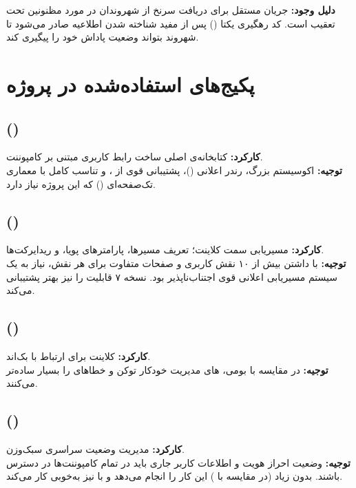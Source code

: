 \documentclass[12pt]{article} %
\theoremstyle{definition}
\begin{document}
\textbf{دلیل وجود:}
جریان مستقل برای دریافت سرنخ از شهروندان در مورد مظنونین تحت تعقیب است.
کد رهگیری یکتا () پس از مفید شناخته شدن اطلاعیه صادر می‌شود تا شهروند بتواند وضعیت پاداش خود را پیگیری کند.

\section{پکیج‌های  استفاده‌شده در پروژه}

\subsection{ ()}
\textbf{کارکرد:} کتابخانه‌ی اصلی ساخت رابط کاربری مبتنی بر کامپوننت.\\
\textbf{توجیه:} اکوسیستم بزرگ، رندر اعلانی ()، پشتیبانی قوی از ، و تناسب کامل با معماری تک‌صفحه‌ای () که این پروژه نیاز دارد.

\subsection{ ()}
\textbf{کارکرد:} مسیریابی سمت کلاینت؛ تعریف مسیرها، پارامترهای پویا، و ریدایرکت‌ها.\\
\textbf{توجیه:} با داشتن بیش از ۱۰ نقش کاربری و صفحات متفاوت برای هر نقش، نیاز به یک سیستم مسیریابی اعلانی قوی اجتناب‌ناپذیر بود. نسخه ۷ قابلیت  را نیز بهتر پشتیبانی می‌کند.

\subsection{ ()}
\textbf{کارکرد:} کلاینت  برای ارتباط با  بک‌اند.\\
\textbf{توجیه:} در مقایسه با  بومی، های  مدیریت خودکار توکن  و خطاهای  را بسیار ساده‌تر می‌کنند.

\subsection{ ()}
\textbf{کارکرد:} مدیریت وضعیت سراسری سبک‌وزن.\\
\textbf{توجیه:} وضعیت احراز هویت و اطلاعات کاربر جاری باید در تمام کامپوننت‌ها در دسترس باشند.  بدون  زیاد (در مقایسه با ) این کار را انجام می‌دهد و با  نیز به‌خوبی کار می‌کند.
\end{document}
